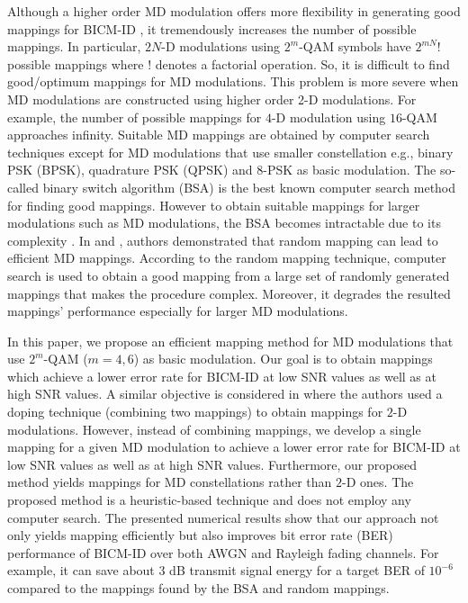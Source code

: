 \documentclass[12pt, draftclsnofoot, onecolumn]{IEEEtran}
\begin{document}
Although a higher order MD modulation  offers more flexibility in generating good mappings for BICM-ID  \cite{MD-Hyper-Ha}, it tremendously increases the number of possible mappings. In particular,  $2N$-D modulations using $2^m$-QAM  symbols have  $2^{mN}!$  possible mappings where $!$ denotes a factorial operation.      So,  it is difficult  to find good/optimum mappings for   MD modulations. This problem is  more severe when  MD modulations are constructed using  higher order 2-D modulations. For example,  the number of possible mappings for $4$-D modulation using $16$-QAM  approaches infinity. 
  Suitable  MD mappings   are obtained by computer search techniques except for  MD modulations that use smaller constellation   e.g.,  binary PSK (BPSK), quadrature PSK (QPSK) and $8$-PSK as basic modulation.
 The so-called binary switch algorithm (BSA) \cite{BSA} is  the best known computer search method for finding good mappings.  However to obtain  suitable mappings for larger modulations such as MD modulations, the BSA becomes  intractable due to its  complexity \cite{rndm_map1}. In \cite{rndm_map1} and \cite{rndm_map2}, authors demonstrated  that random mapping can lead  to  efficient MD mappings. According to  the random mapping  technique,   computer search is used to obtain  a good mapping from a large  set  of randomly generated mappings that makes the procedure complex. Moreover, it degrades the resulted mappings' performance  especially for larger MD modulations.    

In this paper, we propose an efficient mapping method for MD modulations that use $2^{m}$-QAM ($m=4,6$) as basic modulation.   Our goal is to obtain mappings which achieve a lower error rate for BICM-ID at low SNR values as well as at high SNR values. A similar objective  is considered in \cite{MSED} where the authors used  a doping technique (combining two mappings) to obtain mappings for  $2$-D modulations. However,  instead of combining mappings,  we develop a single mapping for a given MD modulation  to  achieve a lower error rate for BICM-ID at low SNR values as well as at high SNR values.  Furthermore, our proposed method yields  mappings for MD constellations rather than $2$-D ones.   The proposed method is a heuristic-based technique and does not employ any computer search. The presented numerical results show that our approach \color{black}  not only yields mapping efficiently but also improves bit error rate (BER) performance of BICM-ID over both AWGN and Rayleigh fading channels. For example, it can save about $3$ dB transmit signal energy for a target BER of $10^{-6}$ compared to   the mappings found by the BSA and random mappings.\color{black}
\end{document}
